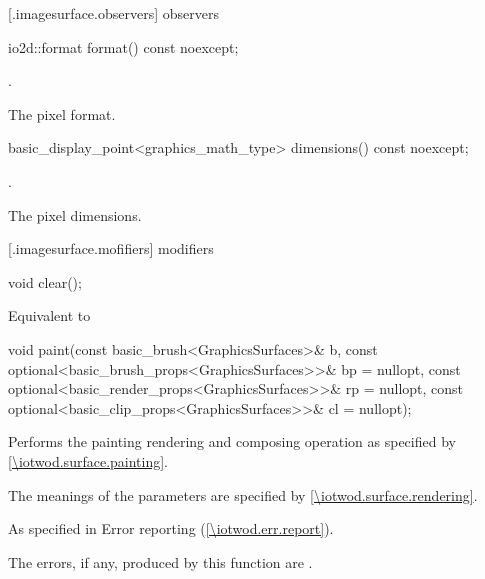  [\iotwod.imagesurface.observers] { observers}

%
\begin{itemdecl}
io2d::format format() const noexcept;
\end{itemdecl}
\begin{itemdescr}
\pnum
\returns {}.

\pnum
\remarks
The pixel format.
\end{itemdescr}

%
\begin{itemdecl}
basic_display_point<graphics_math_type> dimensions() const noexcept;
\end{itemdecl}
\begin{itemdescr}
\pnum
\returns {}.

\pnum
\remarks
The pixel dimensions.
\end{itemdescr}

 [\iotwod.imagesurface.mofifiers] { modifiers}

%
\begin{itemdecl}
void clear();
\end{itemdecl}
\begin{itemdescr}
\pnum
\effects
Equivalent to 
\end{itemdescr}

%
\begin{itemdecl}
void paint(const basic_brush<GraphicsSurfaces>& b,
  const optional<basic_brush_props<GraphicsSurfaces>>& bp = nullopt,
  const optional<basic_render_props<GraphicsSurfaces>>& rp = nullopt,
  const optional<basic_clip_props<GraphicsSurfaces>>& cl = nullopt);
\end{itemdecl}
\begin{itemdescr}
\pnum
\effects
Performs the painting rendering and composing operation as specified by \ref{\iotwod.surface.painting}.

\pnum
The meanings of the parameters are specified by \ref{\iotwod.surface.rendering}.

\pnum
\throws
As specified in Error reporting (\ref{\iotwod.err.report}).

\pnum
\errors
The errors, if any, produced by this function are .
\end{itemdescr}

